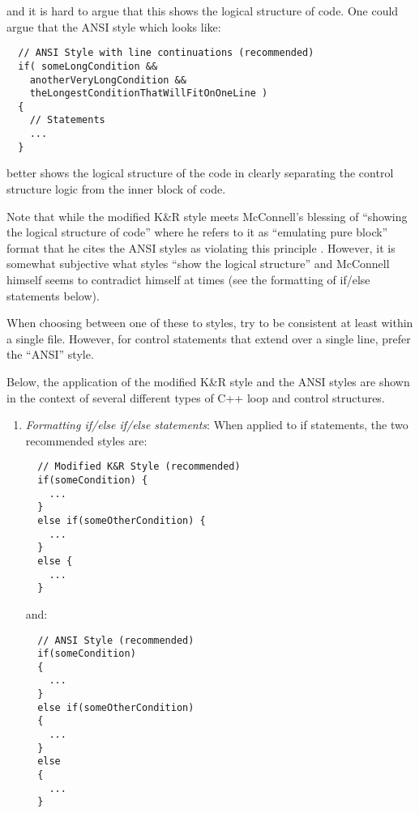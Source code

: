 \begin{enumerate}
{}\noindent{}and it is hard to argue that this shows the logical structure of
code.  One could argue that the ANSI style which looks like:

{\small\begin{verbatim}
  // ANSI Style with line continuations (recommended)
  if( someLongCondition &&
    anotherVeryLongCondition &&
    theLongestConditionThatWillFitOnOneLine )
  {
    // Statements
    ...
  }
\end{verbatim}}

better shows the logical structure of the code in clearly separating the
control structure logic from the inner block of code.

Note that while the modified K\&R style meets McConnell's blessing of
``showing the logical structure of code'' where he refers to it as ``emulating
pure block'' format that he cites the ANSI styles as violating this principle
{}\cite[Section 31.1]{CodeComplete2nd04}.  However, it is somewhat subjective
what styles ``show the logical structure'' and McConnell himself seems to
contradict himself at times (see the formatting of if/else statements below).

When choosing between one of these to styles, try to be consistent at least
within a single file.  However, for control statements that extend over a
single line, prefer the ``ANSI'' style.

Below, the application of the modified K\&R style and the ANSI styles are
shown in the context of several different types of C++ loop and control
structures.

  \begin{enumerate}

  {}\item\textit{Formatting if/else if/else
  statements}: When applied to if statements, the two recommended styles are:

  {\small\begin{verbatim}
  // Modified K&R Style (recommended)
  if(someCondition) {
    ...
  }
  else if(someOtherCondition) {
    ...
  }
  else {
    ...
  }
  \end{verbatim}}
  
  {}\noindent{}and:
  
  {\small\begin{verbatim}
  // ANSI Style (recommended)
  if(someCondition)
  {
    ...
  }
  else if(someOtherCondition)
  {
    ...
  }
  else
  {
    ...
  }
  \end{verbatim}}


\end{enumerate}
\end{enumerate}
